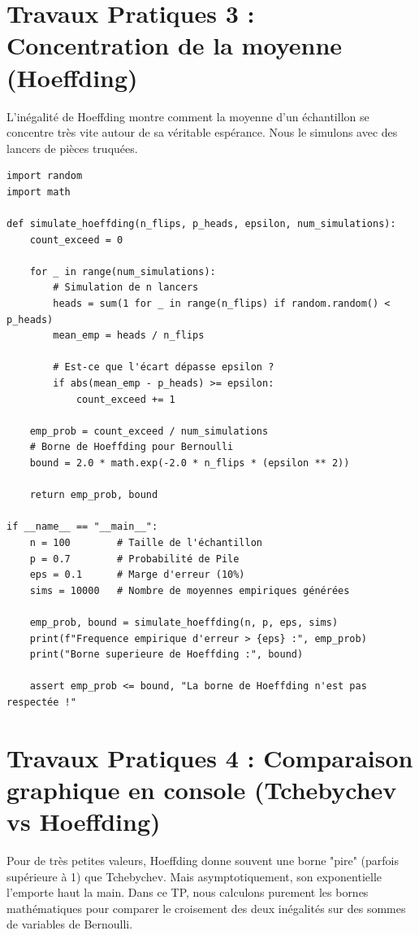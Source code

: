 \documentclass[11pt,a4paper]{article}
\begin{document}
\section*{Travaux Pratiques 3 : Concentration de la moyenne (Hoeffding)}

L'inégalité de Hoeffding montre comment la moyenne d'un échantillon se concentre très vite autour de sa véritable espérance. Nous le simulons avec des lancers de pièces truquées.

\begin{lstlisting}
import random
import math

def simulate_hoeffding(n_flips, p_heads, epsilon, num_simulations):
    count_exceed = 0

    for _ in range(num_simulations):
        # Simulation de n lancers
        heads = sum(1 for _ in range(n_flips) if random.random() < p_heads)
        mean_emp = heads / n_flips

        # Est-ce que l'écart dépasse epsilon ?
        if abs(mean_emp - p_heads) >= epsilon:
            count_exceed += 1

    emp_prob = count_exceed / num_simulations
    # Borne de Hoeffding pour Bernoulli
    bound = 2.0 * math.exp(-2.0 * n_flips * (epsilon ** 2))

    return emp_prob, bound

if __name__ == "__main__":
    n = 100        # Taille de l'échantillon
    p = 0.7        # Probabilité de Pile
    eps = 0.1      # Marge d'erreur (10%)
    sims = 10000   # Nombre de moyennes empiriques générées

    emp_prob, bound = simulate_hoeffding(n, p, eps, sims)
    print(f"Frequence empirique d'erreur > {eps} :", emp_prob)
    print("Borne superieure de Hoeffding :", bound)

    assert emp_prob <= bound, "La borne de Hoeffding n'est pas respectée !"
\end{lstlisting}


\section*{Travaux Pratiques 4 : Comparaison graphique en console (Tchebychev vs Hoeffding)}

Pour de très petites valeurs, Hoeffding donne souvent une borne "pire" (parfois supérieure à 1) que Tchebychev. Mais asymptotiquement, son exponentielle l'emporte haut la main.
Dans ce TP, nous calculons purement les bornes mathématiques pour comparer le croisement des deux inégalités sur des sommes de variables de Bernoulli.
\end{document}
